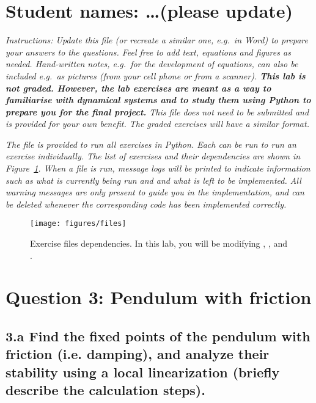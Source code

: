 \documentclass{cmc}
\begin{document}
\pagestyle{fancy}
 

\section*{Student names: \ldots (please update)}

\textit{Instructions: Update this file (or recreate a similar one, e.g.\ in
  Word) to prepare your answers to the questions. Feel free to add text,
  equations and figures as needed. Hand-written notes, e.g.\ for the development
  of equations, can also be included e.g.\ as pictures (from your cell phone or
  from a scanner).  \textbf{This lab is not graded. However, the lab exercises
    are meant as a way to familiarise with dynamical systems and to study them
    using Python to prepare you for the final project.} This file does not need
  to be submitted and is provided for your own benefit. The graded exercises
  will have a similar format.}

\textit{The file  is provided to run all exercises in
  Python. Each  can be run to run an exercise
  individually. The list of exercises and their dependencies are shown in
  Figure~\ref{fig:files}. When a file is run, message logs will be printed to
  indicate information such as what is currently being run and and what is left
  to be implemented. All warning messages are only present to guide you in the
  implementation, and can be deleted whenever the corresponding code has been
  implemented correctly.}

\begin{figure}[ht]
  \centering \texttt{[image: figures/files]}
  \caption{\label{fig:files} Exercise files dependencies. In this lab, you will
    be modifying , ,
     and .}
\end{figure}

\section*{Question 3: Pendulum with friction}

\subsection*{3.a Find the fixed points of the pendulum with friction
  (i.e. damping), and analyze their stability using a local linearization
  (briefly describe the calculation steps). }
\end{document}
